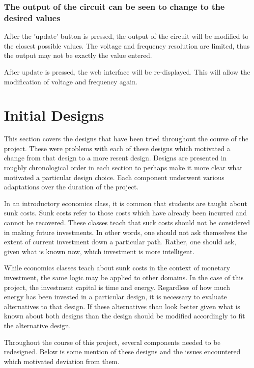 \documentclass{article}	%
\begin{document}
\begin{multicols}{2}
\subsubsection{The output of the circuit can be seen to change to the desired values}
After the 'update' button is pressed,
the output of the circuit will be modified
to the closest possible values.
The voltage and frequency resolution are limited,
thus the output may not be exactly the value entered.

After update is pressed,
the web interface will be re-displayed.
This will allow the modification of voltage and frequency again.

\newpage
\section{Initial Designs}
This section covers the designs that have been tried
throughout the course of the project. 
These were problems with each of these designs
which motivated a change from that design to
a more resent design.
Designs are presented in roughly chronological order in each section
to perhaps make it more clear what motivated
a particular design choice.
Each component underwent various adaptations 
over the duration of the project.

In an introductory economics class,
it is common that students are taught about sunk costs.
Sunk costs refer to those costs which
have already been incurred and
cannot be recovered.
These classes teach that suck costs should not
be considered in making future investments.
In other words,
one should not ask themselves the extent of 
current investment down a particular path.
Rather, one should ask,
given what is known now,
which investment is more intelligent.

While economics classes teach about sunk costs in
the context of monetary investment,
the same logic may be applied to other domains.
In the case of this project,
the investment capital is time and energy.
Regardless of how much energy has been invested
in a particular design,
it is necessary to evaluate alternatives to that design.
If these alternatives than look better
given what is known about both designs
than the design should be modified accordingly
to fit the alternative design.

Throughout the course of this project,
several components needed to be redesigned.
Below is some mention of these designs and
the issues encountered which motivated deviation from them.


\end{multicols}
\end{document}
